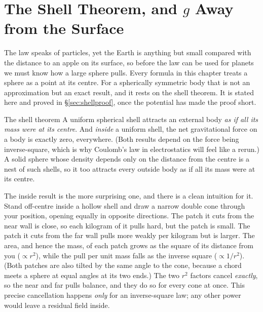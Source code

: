 
\section{\texorpdfstring{The Shell Theorem, and $g$ Away from the Surface}{The Shell Theorem, and g Away from the Surface}}\label{sec:shell}

The law speaks of particles, yet the Earth is anything but small compared with the distance to an apple
on its surface, so before the law can be used for planets we must know how a large sphere pulls. Every
formula in this chapter treats a sphere as a point at its centre. For a spherically symmetric
body that is not an approximation but an exact result, and it rests on the shell theorem. It is stated
here and proved in \S\ref{sec:shellproof}, once the potential has made the proof short.

\begin{keybox}{The shell theorem}
A uniform spherical shell attracts an external body \emph{as if all its mass were at its centre}. And
\emph{inside} a uniform shell, the net gravitational force on a body is exactly zero, everywhere. (Both results depend
on the force being inverse-square, which is why Coulomb's law in electrostatics will feel like a rerun.)
A solid sphere whose density depends only on the distance from the centre is a nest of such shells, so
it too attracts every outside body as if all its mass were at its centre.
\end{keybox}

The inside result is the more surprising one, and there is a clean intuition for it. Stand off-centre
inside a hollow shell and draw a narrow double cone through your position, opening equally in opposite
directions. The patch it cuts from the near wall is close, so each kilogram of it pulls hard, but the
patch is small. The patch it cuts from the far wall pulls more weakly per kilogram but is larger. The
area, and hence the mass, of each patch grows as the square of its distance from you ($\propto r^2$),
while the pull per unit mass falls as the inverse square ($\propto 1/r^2$). (Both patches are also tilted
by the same angle to the cone, because a chord meets a sphere at equal angles at its two ends.) The two
$r^2$ factors cancel \emph{exactly}, so the near and far pulls balance, and they do so for every cone
at once. This precise cancellation
happens \emph{only} for an inverse-square law; any other power would leave a residual field inside.

